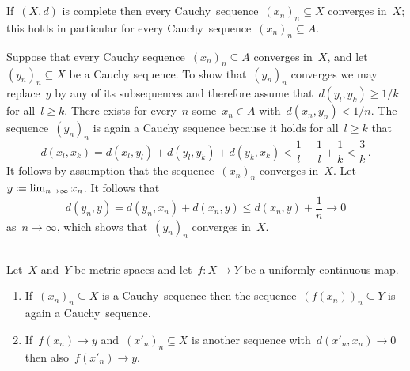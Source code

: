 \section{}





\subsection{}

If~$(X,d)$ is complete then every Cauchy~sequence~$(x_n)_n \subseteq X$ converges in~$X$;
this holds in particular for every Cauchy~sequence~$(x_n)_n \subseteq A$.

Suppose that every Cauchy sequence~$(x_n)_n \subseteq A$ converges in~$X$, and let~$(y_n)_n \subseteq X$ be a Cauchy sequence.
To show that~$(y_n)_n$ converges we may replace~$y$ by any of its subsequences and therefore assume that~$d(y_l, y_k) \geq 1/k$ for all~$l \geq k$.
There exists for every~$n$ some~$x_n \in A$ with~$d(x_n, y_n) < 1/n$.
The sequence~$(y_n)_n$ is again a Cauchy sequence because it holds for all~$l \geq k$ that
\[
    d(x_l, x_k)
  = d(x_l, y_l) + d(y_l, y_k) + d(y_k, x_k)
  < \frac{1}{l} + \frac{1}{l} + \frac{1}{k}
  < \frac{3}{k} \,.
\]
It follows by assumption that the sequence~$(x_n)_n$ converges in~$X$.
Let~$y \coloneqq \lim_{n \to \infty} x_n$.
It follows that
\[
        d(y_n, y)
  =     d(y_n, x_n) + d(x_n, y)
  \leq  d(x_n, y) + \frac{1}{n}
  \to   0
\]
as~$n \to \infty$, which shows that~$(y_n)_n$ converges in~$X$.





\subsection{}
\label{extension of uniformly continuous maps}

\begin{lemma}
  \label{uniformly continuous preserves cauchy}
  Let~$X$ and~$Y$ be metric spaces and let~$f \colon X \to Y$ be a uniformly continuous map.
  \begin{enumerate}
    \item
      If~$(x_n)_n \subseteq X$ is a Cauchy~sequence then the sequence~$(f(x_n))_n \subseteq Y$ is again a Cauchy~sequence.
    \item
      If~$f(x_n) \to y$ and~$(x'_n)_n \subseteq X$ is another sequence with~$d(x'_n, x_n) \to 0$ then also~$f(x'_n) \to y$.
  \end{enumerate}
\end{lemma}

